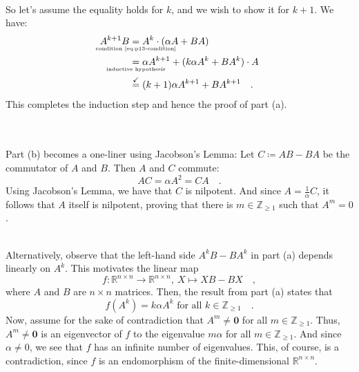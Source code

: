 \begin{solution}
    ~\\
    So let's assume the equality holds for \( k \), and we wish to show it for \( k+1 \). We have:
    \begin{align*}
        A^{k+1}B & \underset{\clap{\tiny \text{condition \eqref{eq:p13-condition}}}}{=} A^k \cdot (\alpha A + BA)        \\
        & \underset{\clap{\tiny \text{inductive hypothesis}}}{=} \alpha A^{k+1} + (k \alpha A^k + BA^k) \cdot A \\
        & \overset{\checkmark}{=} (k + 1) \alpha A^{k+1} + BA^{k+1} \quad .
    \end{align*}
    This completes the induction step and hence the proof of part (a).

    ~\\ \\
    Part (b) becomes a one-liner using Jacobson's Lemma: Let \( C \coloneqq AB - BA \) be the commutator of \( A \) and \( B \). Then \( A \) and \( C \) commute:
    \[ AC = \alpha A^2 = CA \quad . \]
    Using Jacobson's Lemma, we have that \( C \) is nilpotent. And since \( A = \frac{1}{\alpha} C \), it follows that \( A \) itself is nilpotent, proving that there is \( m \in \mathbb{Z}_{\geq 1} \) such that \( A^m = 0 \).

    ~\\
    Alternatively, observe that the left-hand side \( A^kB - BA^k \) in part (a) depends linearly on \( A^k \). This motivates the linear map
    \[ f: \mathbb{R}^{n \times n} \to \mathbb{R}^{n \times n}, \ X \mapsto XB - BX \quad , \]
    where \( A \) and \( B \) are \( n \times n \) matrices. Then, the result from part (a) states that
    \[ f(A^k) = k \alpha A^k \text{ for all } k \in \mathbb{Z}_{\geq 1} \quad . \]
    Now, assume for the sake of contradiction that \( A^m \neq \mathbf{0} \) for all \( m \in \mathbb{Z}_{\geq 1} \). Thus, \( A^m \neq \mathbf{0} \) is an eigenvector of \( f \) to the eigenvalue \( m \alpha \) for all \( m \in \mathbb{Z}_{\geq 1} \). And since \( \alpha \neq 0 \), we see that \( f \) has an infinite number of eigenvalues. This, of course, is a contradiction, since \( f \) is an endomorphism of the finite-dimensional \( \mathbb{R}^{n \times n} \).
\end{solution}
